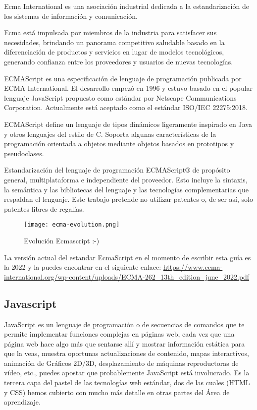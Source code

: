 \begin{enumerate}
\cite{ecma} Ecma International es una asociación industrial dedicada a la estandarización de los sistemas de información y comunicación.

Ecma está impulsada por miembros de la industria para satisfacer sus necesidades, brindando un panorama competitivo saludable basado en la diferenciación de productos y servicios en lugar de modelos tecnológicos, generando confianza entre los proveedores y usuarios de nuevas tecnologías.

\cite{wiki} ECMAScript es una especificación de lenguaje de programación publicada por ECMA International. El desarrollo empezó en 1996 y estuvo basado en el popular lenguaje JavaScript propuesto como estándar por Netscape Communications Corporation. Actualmente está aceptado como el estándar ISO/IEC 22275:2018.

ECMAScript define un lenguaje de tipos dinámicos ligeramente inspirado en Java y otros lenguajes del estilo de C. Soporta algunas características de la programación orientada a objetos mediante objetos basados en prototipos y pseudoclases.

\cite{ecma} Estandarización del lenguaje de programación ECMAScript® de propósito general, multiplataforma e independiente del proveedor. Esto incluye la sintaxis, la semántica y las bibliotecas del lenguaje y las tecnologías complementarias que respaldan el lenguaje. Este trabajo pretende no utilizar patentes o, de ser así, solo patentes libres de regalías.

\begin{figure}[H]
	\center
	\texttt{[image: ecma-evolution.png]}
	\caption{Evolución Ecmascript :-)}
\end{figure}

\begin{remark}
	La versión actual del estandar EcmaScript en el momento de escribir esta guía es la 2022 y la puedes encontrar en el siguiente enlace:
	\url{https://www.ecma-international.org/wp-content/uploads/ECMA-262_13th_edition_june_2022.pdf}
\end{remark}


\subsection{Javascript}
\cite{mdn} JavaScript es un lenguaje de programación o de secuencias de comandos que te permite implementar funciones complejas en páginas web, cada vez que una página web hace algo más que sentarse allí y mostrar información estática para que la veas, muestra oportunas actualizaciones de contenido, mapas interactivos, animación de Gráficos 2D/3D, desplazamiento de máquinas reproductoras de vídeo, etc., puedes apostar que probablemente JavaScript está involucrado. Es la tercera capa del pastel de las tecnologías web estándar, dos de las cuales (HTML y CSS) hemos cubierto con mucho más detalle en otras partes del Área de aprendizaje.


\end{enumerate}
